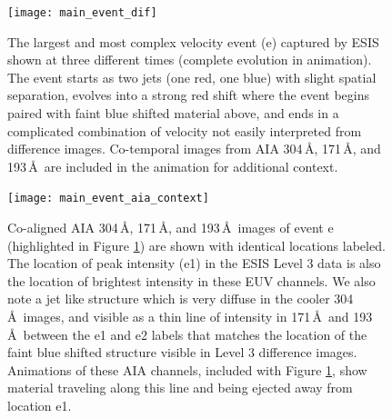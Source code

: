     	
    	\begin{figure}[htb!]
    		\texttt{[image: main\_event\_dif]}
    		\centering
    		\caption{The largest and most complex velocity event (e) %
    		captured by ESIS shown at three different times (complete evolution in animation). The event starts as two jets (one red, one blue) with slight spatial separation, evolves into a strong red shift where the event begins paired with faint blue shifted material above, and ends in a complicated combination of velocity not easily interpreted from difference images. Co-temporal images from AIA 304\,\AA, 171\,\AA, and 193\,\AA\ are included in the animation for additional context.}
    		\label{fig:main_event}
    	\end{figure}
    
   		\begin{figure}[htb!]
    		\texttt{[image: main\_event\_aia\_context]}
    		\centering
    		\caption{Co-aligned AIA 304\,\AA, 171\,\AA, and 193\,\AA\ images of event e  (highlighted in Figure \ref{fig:main_event}) are shown with identical locations labeled. The location of peak intensity (e1) in the ESIS Level 3 data is also the location of brightest intensity in these EUV channels. We also note a jet like structure which is very diffuse in the cooler 304\,\AA\ images, and visible as a thin line of intensity in 171\,\AA \ and 193\,\AA \ between the e1 and e2 labels that matches the location of the faint blue shifted structure visible in Level 3 difference images. Animations of these AIA channels, included with Figure \ref{fig:main_event}, show material traveling along this line and being ejected away from location e1.}
    		\label{fig:main_event_aia}
    	\end{figure}
		
